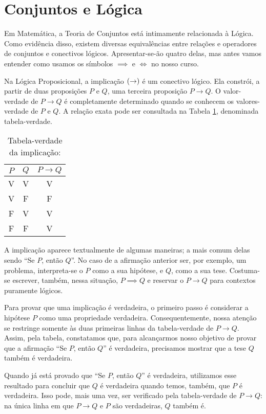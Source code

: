 \section{Conjuntos e Lógica}



Em Matemática, a Teoria de Conjuntos está intimamente relacionada à Lógica.
Como evidência disso, existem diversas equivalências entre relações e operadores de conjuntos e conectivos lógicos.
Apresentar-se-ão quatro delas, mas antes vamos entender como usamos os símbolos $ \implies$ e $\iff$ no nosso curso.

Na Lógica Proposicional, a implicação $\left(\to\right) $ é um conectivo lógico. 
Ela constrói, a partir de duas proposições $P$ e $Q$, uma terceira proposição $P \to Q$.
O valor-verdade de $P \to Q$ é completamente determinado quando se conhecem os valores-verdade de $P$ e $Q$.
A relação exata pode ser consultada na Tabela \ref{tbl:implicacao}, denominada tabela-verdade.

\begin{table}[h]
\caption{Tabela-verdade da implicação:}
\label{tbl:implicacao}
\centering
\begin{tabular}{ccc}
$P$		& $Q$		& $P \to Q$	\\ \hline
V		& V			& V			\\
V		& F			& F			\\
F		& V			& V			\\
F		& F			& V			\\	
\end{tabular}
\end{table}

A implicação aparece textualmente de algumas maneiras; a mais comum delas sendo ``Se $P$, então $Q$''.
No caso de a afirmação anterior ser, por exemplo, um problema, interpreta-se o $P$ como a sua hipótese, e $Q$, como a sua tese.
Costuma-se escrever, também, nessa situação, $P \implies Q$ e reservar o $P \to Q$ para contextos puramente lógicos.

Para provar que uma implicação é verdadeira, o primeiro passo é considerar a hipótese $P$ como uma propriedade verdadeira.
Consequentemente, nossa atenção se restringe somente às duas primeiras linhas da tabela-verdade de $P \to Q$.
Assim, pela tabela, constatamos que, para alcançarmos nosso objetivo de provar que a afirmação ``Se $P$, então $Q$'' é verdadeira,
precisamos mostrar que a tese $Q$ também é verdadeira.

Quando já está provado que ``Se $P$, então $Q$'' é verdadeira, 
utilizamos esse resultado para concluir que $Q$ é verdadeira quando temos, também, que $P$ é verdadeira.
Isso pode, mais uma vez, ser verificado pela tabela-verdade de $P \to Q$:
na única linha em que $P \to Q$ e $P$ são verdadeiras, $Q$ também é.

